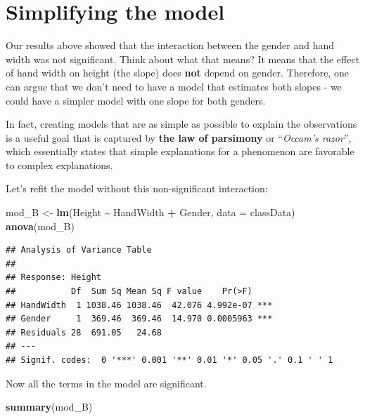 \documentclass[
  a4paperpaper,
]{book}
\newenvironment{Shaded}{\begin{snugshade}}{\end{snugshade}}
\newcommand{\DataTypeTok}[1]{\textcolor[rgb]{0.13,0.29,0.53}{#1}}
\newcommand{\KeywordTok}[1]{\textcolor[rgb]{0.13,0.29,0.53}{\textbf{#1}}}
\newcommand{\NormalTok}[1]{#1}
\newcommand{\OperatorTok}[1]{\textcolor[rgb]{0.81,0.36,0.00}{\textbf{#1}}}
\newcommand{\StringTok}[1]{\textcolor[rgb]{0.31,0.60,0.02}{#1}}
\begin{document}
\hypertarget{simplifying-the-model}{%
\section{Simplifying the model}\label{simplifying-the-model}}

Our results above showed that the interaction between the gender and hand width was not significant. Think about what that means? It means that the effect of hand width on height (the slope) does \textbf{not} depend on gender. Therefore, one can argue that we don't need to have a model that estimates both slopes - we could have a simpler model with one slope for both genders.

In fact, creating models that are as simple as possible to explain the observations is a useful goal that is captured by \textbf{the law of parsimony} or ``\emph{Occam's razor}'', which essentially states that simple explanations for a phenomenon are favorable to complex explanations.

Let's refit the model without this non-significant interaction:

\begin{Shaded}
\begin{Highlighting}[]
\NormalTok{mod\_B \textless{}{-}}\StringTok{ }\KeywordTok{lm}\NormalTok{(Height }\OperatorTok{\textasciitilde{}}\StringTok{ }\NormalTok{HandWidth }\OperatorTok{+}\StringTok{ }\NormalTok{Gender, }\DataTypeTok{data =}\NormalTok{ classData)}
\KeywordTok{anova}\NormalTok{(mod\_B)}
\end{Highlighting}
\end{Shaded}

\begin{verbatim}
## Analysis of Variance Table
## 
## Response: Height
##           Df  Sum Sq Mean Sq F value    Pr(>F)    
## HandWidth  1 1038.46 1038.46  42.076 4.992e-07 ***
## Gender     1  369.46  369.46  14.970 0.0005963 ***
## Residuals 28  691.05   24.68                      
## ---
## Signif. codes:  0 '***' 0.001 '**' 0.01 '*' 0.05 '.' 0.1 ' ' 1
\end{verbatim}

Now all the terms in the model are significant.

\begin{Shaded}
\begin{Highlighting}[]
\KeywordTok{summary}\NormalTok{(mod\_B)}
\end{Highlighting}
\end{Shaded}
\end{document}
